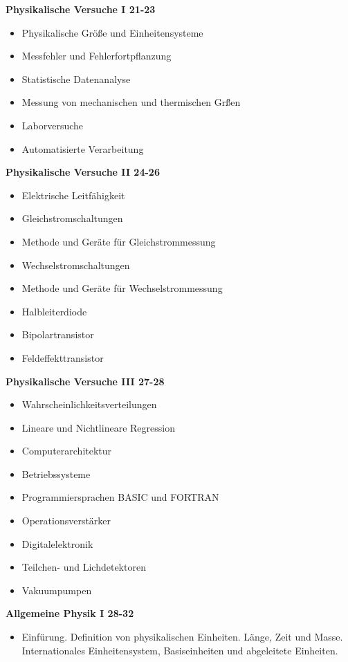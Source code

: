 \documentclass[a4paper,11pt]{article}
\begin{document}
{\bfseries Physikalische Versuche I 21-23}
\begin{itemize}
  \item Physikalische Gr\"o{\ss}e und Einheitensysteme
  \item Messfehler und Fehlerfortpflanzung
  \item Statistische Datenanalyse
  \item Messung von mechanischen und thermischen Gr\"{\ss}en
  \item Laborversuche
  \item Automatisierte Verarbeitung
\end{itemize}

{\bfseries Physikalische Versuche II 24-26}
\begin{itemize}
  \item Elektrische Leitfähigkeit
  \item Gleichstromschaltungen
  \item Methode und Ger\"ate f\"ur Gleichstrommessung
  \item Wechselstromschaltungen
  \item Methode und Ger\"ate f\"ur Wechselstrommessung
  \item Halbleiterdiode
  \item Bipolartransistor
  \item Feldeffekttransistor
\end{itemize}

{\bfseries Physikalische Versuche III 27-28}
\begin{itemize}
  \item Wahrscheinlichkeitsverteilungen
  \item Lineare und Nichtlineare Regression
  \item Computerarchitektur
  \item Betriebssysteme
  \item Programmiersprachen BASIC und FORTRAN
  \item Operationsverstärker
  \item Digitalelektronik
  \item Teilchen- und Lichdetektoren
  \item Vakuumpumpen
\end{itemize}

{\bfseries Allgemeine Physik I 28-32}
\begin{itemize}
  \item Einf\"urung. Definition von physikalischen Einheiten. Länge, Zeit und
  Masse. Internationales Einheitensystem, Basiseinheiten und abgeleitete
  Einheiten. 
\end{itemize}
\end{document}
